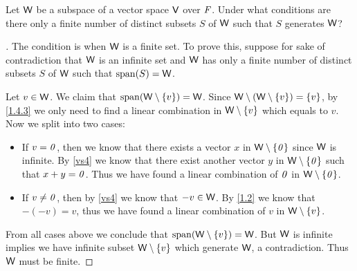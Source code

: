 \begin{ex}\label{ex:1.4.17}
  Let \(\mathsf{W}\) be a subspace of a vector space \(\mathsf{V}\) over \(\mathit{F}\).
  Under what conditions are there only a finite number of distinct subsets \(S\) of \(\mathsf{W}\) such that \(S\) generates \(\mathsf{W}\)?
\end{ex}

\begin{proof}[]
  The condition is when \(\mathsf{W}\) is a finite set.
  To prove this, suppose for sake of contradiction that \(\mathsf{W}\) is an infinite set and \(\mathsf{W}\) has only a finite number of distinct subsets \(S\) of \(\mathsf{W}\) such that \(\spn{S} = \W\).

  Let \(v \in \mathsf{W}\).
  We claim that \(\spn{\W \setminus \set{v}} = \W\).
  Since \(\mathsf{W} \setminus (\mathsf{W} \setminus \left\lbrace v\right\rbrace) = \left\lbrace v\right\rbrace\), by \cref{1.4.3} we only need to find a linear combination in \(\mathsf{W} \setminus \left\lbrace v\right\rbrace\) which equals to \(v\).
  Now we split into two cases:
  \begin{itemize}
    \item If \(v = \mathit{0}\), then we know that there exists a vector \(x\) in \(\mathsf{W} \setminus \left\lbrace\mathit{0}\right\rbrace\) since \(\mathsf{W}\) is infinite.
          By \ref{vs4} we know that there exist another vector \(y\) in \(\mathsf{W} \setminus \left\lbrace\mathit{0}\right\rbrace\) such that \(x + y = \mathit{0}\).
          Thus we have found a linear combination of \(\mathit{0}\) in \(\mathsf{W} \setminus \left\lbrace\mathit{0}\right\rbrace\).
    \item If \(v \neq \mathit{0}\), then by \ref{vs4} we know that \(-v \in \mathsf{W}\).
          By \cref{1.2} we know that \(-(-v) = v\), thus we have found a linear combination of \(v\) in \(\mathsf{W} \setminus \left\lbrace v\right\rbrace\).
  \end{itemize}
  From all cases above we conclude that \(\spn{\W \setminus \set{v}} = \W\).
  But \(\mathsf{W}\) is infinite implies we have infinite subset \(\mathsf{W} \setminus \left\lbrace v\right\rbrace\) which generate \(\mathsf{W}\), a contradiction.
  Thus \(\mathsf{W}\) must be finite.
\end{proof}
